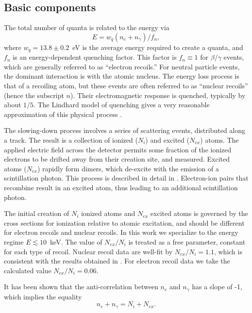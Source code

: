 \documentclass[article]{revtex4-1}[11pt]
\begin{document}
\subsection{Basic components} \label{sec:model:basic}

The total number of quanta is related to the energy \cite{Shutt:2007zz} via
\begin{equation} \label{eq1}
E = w_q (n_e + n_{\gamma}) / f_n,
\end{equation}
where $w_q = 13.8\pm0.2$~eV \cite{Dahl:2009nta} is the average energy required to create a quanta, and $f_n$ is an energy-dependent quenching factor. This factor is $f_n \equiv1$ for $\beta/\gamma$ events, which are generally referred to as ``electron recoils.'' For neutral particle events, the dominant interaction is with the atomic nucleus. The energy loss process is that of a recoiling atom, but these events are often referred to as ``nuclear recoils'' (hence the subscript $n$). Their electromagnetic response is quenched, typically by about $1/5$. The Lindhard model of quenching gives a very reasonable approximation of this physical process \cite{Sorensen:2011bd}.

The slowing-down process involves a series of scattering events, distributed along a track. The result is a collection of ionized ($N_i$) and excited ($N_{ex}$) atoms. The applied electric field across the detector permits some fraction of the ionized electrons to be drifted away from their creation site, and measured. Excited atoms ($N_{ex}$) rapidly form dimers, which de-excite with the emission of a scintillation photon. This process is described in detail in \cite{Doke:1982}. Electron-ion pairs that recombine result in an excited atom, thus leading to an additional scintillation photon.

The initial creation of $N_i$ ionized atoms and $N_{ex}$ excited atoms is governed by the cross sections for ionization relative to atomic excitation, and should be different for electron recoils and nuclear recoils. In this work we specialize to the energy regime $E\lesssim10$~keV. The value of $N_{ex}/N_i$ is treated as a free parameter, constant for each type of recoil. Nuclear recoil data are well-fit by $N_{ex}/N_i=1.1$, which is consistent with the results obtained in \cite{}. For electron recoil data we take the calculated value \cite{} $N_{ex}/N_i=0.06$. 


It has been shown \cite{needref0} that the anti-correlation between $n_e$ and $n_{\gamma}$ has a slope of -1, which implies the equality
\begin{equation}\label{eq2}
n_e + n_{\gamma} = N_i + N_{ex}.
\end{equation}
\end{document}
